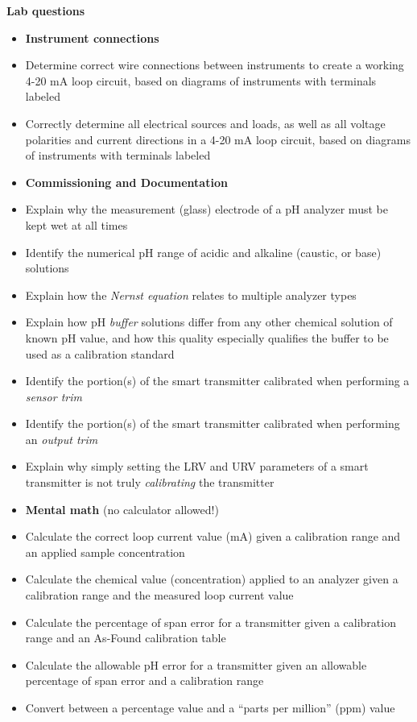 \noindent
{\bf Lab questions}

\vskip 5pt

\begin{itemize}
\item{} {\bf Instrument connections}
\item{} Determine correct wire connections between instruments to create a working 4-20 mA loop circuit, based on diagrams of instruments with terminals labeled
\item{} Correctly determine all electrical sources and loads, as well as all voltage polarities and current directions in a 4-20 mA loop circuit, based on diagrams of instruments with terminals labeled
\end{itemize}

\filbreak

\begin{itemize}
\item{} {\bf Commissioning and Documentation}
\item{} Explain why the measurement (glass) electrode of a pH analyzer must be kept wet at all times
\item{} Identify the numerical pH range of acidic and alkaline (caustic, or base) solutions
\item{} Explain how the {\it Nernst equation} relates to multiple analyzer types
\item{} Explain how pH {\it buffer} solutions differ from any other chemical solution of known pH value, and how this quality especially qualifies the buffer to be used as a calibration standard
\item{} Identify the portion(s) of the smart transmitter calibrated when performing a {\it sensor trim}
\item{} Identify the portion(s) of the smart transmitter calibrated when performing an {\it output trim}
\item{} Explain why simply setting the LRV and URV parameters of a smart transmitter is not truly {\it calibrating} the transmitter
\end{itemize}

\filbreak

\begin{itemize}
\item{} {\bf Mental math} (no calculator allowed!)
\item{} Calculate the correct loop current value (mA) given a calibration range and an applied sample concentration 
\item{} Calculate the chemical value (concentration) applied to an analyzer given a calibration range and the measured loop current value
\item{} Calculate the percentage of span error for a transmitter given a calibration range and an As-Found calibration table 
\item{} Calculate the allowable pH error for a transmitter given an allowable percentage of span error and a calibration range
\item{} Convert between a percentage value and a ``parts per million'' (ppm) value
\end{itemize}

